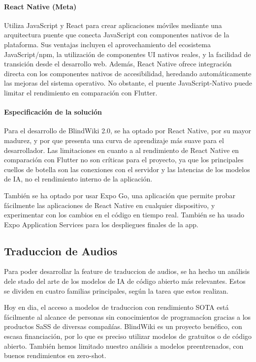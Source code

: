 \paragraph{React Native (Meta)}
Utiliza JavaScript y React para crear aplicaciones móviles mediante una arquitectura puente que conecta JavaScript con componentes nativos de la plataforma. Sus ventajas incluyen el aprovechamiento del ecosistema JavaScript/npm, la utilización de componentes UI nativos reales, y la facilidad de transición desde el desarrollo web. Además, React Native ofrece integración directa con los componentes nativos de accesibilidad, heredando automáticamente las mejoras del sistema operativo. No obstante, el puente JavaScript-Nativo puede limitar el rendimiento en comparación con Flutter.


\paragraph{Especificación de la solución}
Para el desarrollo de BlindWiki 2.0, se ha optado por React Native, por su mayor madurez, y por que presenta una curva de aprendizaje más suave para el desarrollador. Las limitaciones en cuanto a al rendimiento de React Native en comparación con Flutter no son críticas para el proyecto, ya que los principales cuellos de botella son las conexiones con el servidor y las latencias de los modelos de IA, no el rendimiento interno de la aplicación.

También se ha optado por usar Expo Go, una aplicación que permite probar fácilmente las aplicaciones de React Native en cualquier dispositivo, y experimentar con los cambios en el código en tiempo real. También se ha usado Expo Application Services para los despliegues finales de la app.   

\subsection{Traduccion de Audios}
Para poder desarrollar la feature de traduccion de audios, se ha hecho un análisis dele stado del arte de los modelos de IA de código abierto más relevantes. Estos se dividen en cuatro familias principales, según la tarea que estos realizan.

Hoy en dia, el acceso a modelos de traduccion con rendimiento SOTA está fácilmente al alcance de personas sin conocimientos de programacíon gracias a los productos SaSS de diversas compañías. BlindWiki es un proyecto benéfico, con escasa financiación, por lo que es preciso utilizar modelos de gratuitos o de código abierto. También hemos limitado nuestro análisis a modelos preentrenados, con buenos rendimientos en zero-shot.

